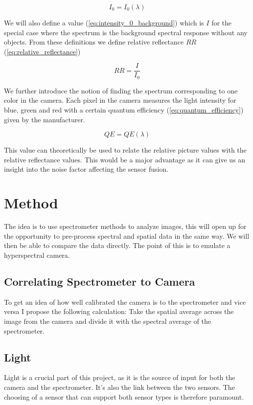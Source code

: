 \documentclass{article}
\begin{document}
\begin{equation}
    \label{eq:intensity_0_background}
    I_0 = I_0(\lambda)
\end{equation}

We will also define a value (\ref{eq:intensity_0_background}) which is $I$ for the special case where the spectrum is the background spectral response without any objects. From these definitions we define relative reflectance $RR$ (\ref{eq:relative_reflectance})

\begin{equation}
    \label{eq:relative_reflectance}
    RR = \frac{I}{I_0}
\end{equation}

We further introduce the notion of finding the spectrum corresponding to one color in the camera. Each pixel in the camera measures the light intensity for blue, green and red with a certain quantum efficiency (\ref{eq:quantum_efficiency}) given by the manufacturer. 

\begin{equation}
    \label{eq:quantum_efficiency}
    QE = QE(\lambda)    
\end{equation}

This value can theoretically be used to relate the relative picture values with the relative reflectance values. This would be a major advantage as it can give us an insight into the noise factor affecting the sensor fusion.  


\section{Method}
The idea is to use spectrometer methods to analyze images, this will open up for the opportunity to pre-process spectral and spatial data in the same way. We will then be able to compare the data directly. The point of this is to emulate a hyperspectral camera. 


\subsection{Correlating Spectrometer to Camera}
\label{sec:method_correlating_spectrum_to_camera}
To get an idea of how well calibrated the camera is to the spectrometer and vice versa I propose the following calculation: 
Take the spatial average across the image from the camera and divide it with the spectral average of the spectrometer. 



\subsection{Light}
Light is a crucial part of this project, as it is the source of input for both the camera and the spectrometer. It's also the link between the two sensors. The choosing of a sensor that can support both sensor types is therefore paramount. 
\end{document}
